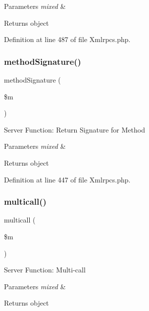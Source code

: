 \begin{DoxyParams}{Parameters}
{\em mixed} & \\
\hline
\end{DoxyParams}
\begin{DoxyReturn}{Returns}
object 
\end{DoxyReturn}


Definition at line 487 of file Xmlrpcs.\+php.

\mbox{\label{class_c_i___xmlrpcs_a9f96cc0bd3338094174eb22cd90d6f2a}} 
\subsubsection{\texorpdfstring{methodSignature()}{methodSignature()}}
{\footnotesize\ttfamily method\+Signature (\begin{DoxyParamCaption}\item[{}]{\$m }\end{DoxyParamCaption})}

Server Function\+: Return Signature for Method


\begin{DoxyParams}{Parameters}
{\em mixed} & \\
\hline
\end{DoxyParams}
\begin{DoxyReturn}{Returns}
object 
\end{DoxyReturn}


Definition at line 447 of file Xmlrpcs.\+php.

\mbox{\label{class_c_i___xmlrpcs_a122ce829a1aa3f0041f922ec5feb95c8}} 
\subsubsection{\texorpdfstring{multicall()}{multicall()}}
{\footnotesize\ttfamily multicall (\begin{DoxyParamCaption}\item[{}]{\$m }\end{DoxyParamCaption})}

Server Function\+: Multi-\/call


\begin{DoxyParams}{Parameters}
{\em mixed} & \\
\hline
\end{DoxyParams}
\begin{DoxyReturn}{Returns}
object 
\end{DoxyReturn}


